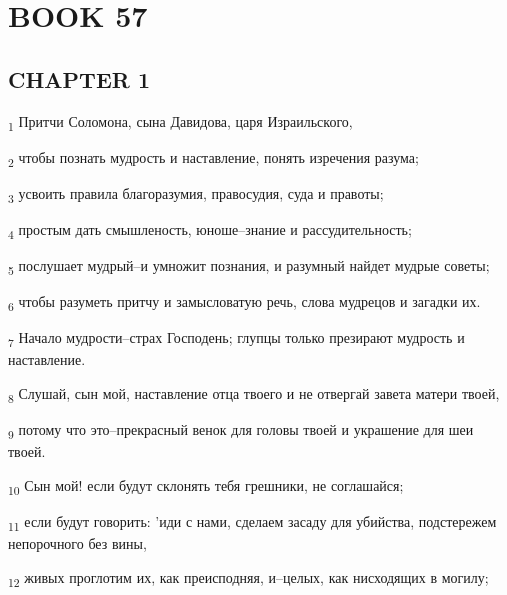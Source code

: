 \section{BOOK 57}
\subsection{CHAPTER 1}
\begin{tcolorbox}
\textsubscript{1} Притчи Соломона, сына Давидова, царя Израильского,
\end{tcolorbox}
\begin{tcolorbox}
\textsubscript{2} чтобы познать мудрость и наставление, понять изречения разума;
\end{tcolorbox}
\begin{tcolorbox}
\textsubscript{3} усвоить правила благоразумия, правосудия, суда и правоты;
\end{tcolorbox}
\begin{tcolorbox}
\textsubscript{4} простым дать смышленость, юноше--знание и рассудительность;
\end{tcolorbox}
\begin{tcolorbox}
\textsubscript{5} послушает мудрый--и умножит познания, и разумный найдет мудрые советы;
\end{tcolorbox}
\begin{tcolorbox}
\textsubscript{6} чтобы разуметь притчу и замысловатую речь, слова мудрецов и загадки их.
\end{tcolorbox}
\begin{tcolorbox}
\textsubscript{7} Начало мудрости--страх Господень; глупцы только презирают мудрость и наставление.
\end{tcolorbox}
\begin{tcolorbox}
\textsubscript{8} Слушай, сын мой, наставление отца твоего и не отвергай завета матери твоей,
\end{tcolorbox}
\begin{tcolorbox}
\textsubscript{9} потому что это--прекрасный венок для головы твоей и украшение для шеи твоей.
\end{tcolorbox}
\begin{tcolorbox}
\textsubscript{10} Сын мой! если будут склонять тебя грешники, не соглашайся;
\end{tcolorbox}
\begin{tcolorbox}
\textsubscript{11} если будут говорить: 'иди с нами, сделаем засаду для убийства, подстережем непорочного без вины,
\end{tcolorbox}
\begin{tcolorbox}
\textsubscript{12} живых проглотим их, как преисподняя, и--целых, как нисходящих в могилу;
\end{tcolorbox}
